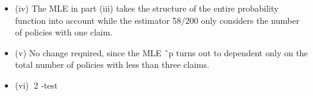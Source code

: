 \documentclass[a4paper,12pt]{article}
\begin{document}
\begin{itemize}
\item (iv) The MLE in part (iii) takes the structure of the entire probability function into
account while the estimator 58/200 only considers the number of policies with
one claim. 
\item (v) No change required, since the MLE ˆp turns out to dependent only on the total
number of policies with less than three claims. 
\item (vi) 2 -test 
\end{itemize}
\end{document}
